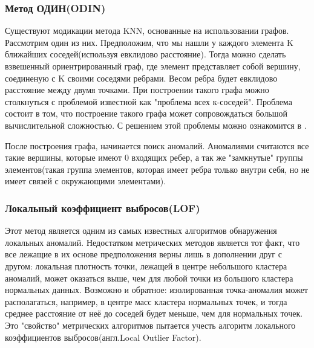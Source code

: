  \subsubsection{Метод ОДИН(ODIN)}
 Существуют модикации метода KNN, основанные на использовании графов. Рассмотрим один из них. Предположим, что мы нашли у каждого элемента K ближайших соседей(используя евклидово расстояние). Тогда можно сделать взвешенный ориентрированный граф, где  элемент представляет собой вершину, соединеную с K своими соседями ребрами\cite{Book19}. Весом ребра будет евклидово расстояние между двумя точками. При построении такого графа можно столкнуться с проблемой известной как "проблема всех к-соседей". Проблема состоит в том, что построение такого графа  может сопровождаться большой вычислительной сложностью. С решением этой проблемы можно ознакомится в \cite{Book20}.
 
 После построения графа, начинается поиск аномалий. Аномалиями считаются все такие вершины, которые имеют 0 входящих ребер, а так же "замкнутые" группы элементов(такая группа элементов, которая имеет ребра только внутри себя, но не имеет связей с окружающими элементами).
 \subsubsection{Локальный коэффициент выбросов(LOF)}
 Этот метод является одним из самых известных алгоритмов обнаружения локальных аномалий. Недостатком метрических методов является тот факт, что все лежащие в их основе предположения верны лишь в дополнении друг с другом: локальная плотность точки, лежащей в центре небольшого кластера аномалий, может оказаться выше, чем для любой точки из большого кластера
 нормальных данных. Возможно и обратное: изолированная точка-аномалия может располагаться, например, в центре масс кластера нормальных точек, и тогда среднее расстояние от неё до соседей будет меньше, чем для нормальных точек. Это "свойство" метрических алгоритмов пытается учесть алгоритм  локального коэффициентов выбросов(англ.Local Outlier Factor).
 
